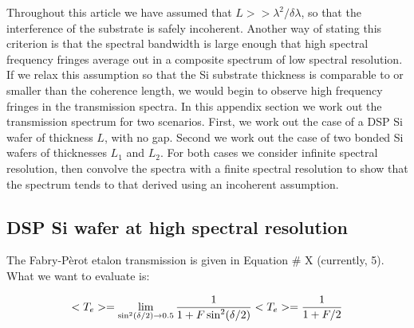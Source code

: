 \documentclass[osajnl,preprint,showpacs,superscriptaddress,12pt]{revtex4-1} %
\begin{document}
Throughout this article we have assumed that $L >> \lambda^2 / \delta \lambda$, so that the interference of the substrate is safely incoherent.  Another way of stating this criterion is that the spectral bandwidth is large enough that high spectral frequency fringes average out in a composite spectrum of low spectral resolution.  If we relax this assumption so that the Si substrate thickness is comparable to or smaller than the coherence length, we would begin to observe high frequency fringes in the transmission spectra.  In this appendix section we work out the transmission spectrum for two scenarios.  First, we work out the case of a DSP Si wafer of thickness $L$, with no gap.  Second we work out the case of two bonded Si wafers of thicknesses $L_1$ and $L_2$.  For both cases we consider infinite spectral resolution, then convolve the spectra with a finite spectral resolution to show that the spectrum tends to that derived using an incoherent assumption.  

\subsection{DSP Si wafer at high spectral resolution}
The Fabry-P\`erot etalon transmission is given in Equation \# X (currently, 5).  What we want to evaluate is:
  
$$
 <T_e> = \lim_{\sin^2(\delta/2) \to 0.5} \frac{1}{1+F\sin^2(\delta/2)} \\
 <T_e> = \frac{1}{1+F/2}
$$









\end{document}
